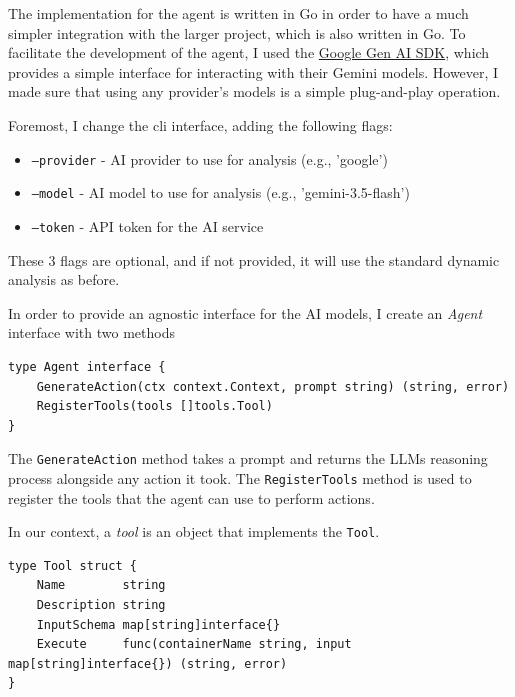 
The implementation for the agent is written in Go in order to have a much simpler integration with the
larger project, which is also written in Go. To facilitate the development of the agent, I used the
\href{https://docs.cloud.google.com/gemini-enterprise-agent-platform/models/sdks/overview#googlegenaisdk_quickstart-go_genai_sdk}{Google Gen AI SDK}, 
which provides a simple interface for interacting with their Gemini models. However, I made sure that using any provider's models is a simple plug-and-play operation.

Foremost, I change the cli interface, adding the following flags:

\begin{itemize}
\item \texttt{--provider} - AI provider to use for analysis (e.g., 'google')
\item \texttt{--model} - AI model to use for analysis (e.g., 'gemini-3.5-flash')
\item \texttt{--token} - API token for the AI service
\end{itemize}

These 3 flags are optional, and if not provided, it will use the standard dynamic analysis as before. 

In order to provide an agnostic interface for the AI models, I create an \textit{Agent} interface with two methods

\lstset{language=Go,caption=Agent interface,label=lst:agent-interface}
\begin{lstlisting}
type Agent interface {
	GenerateAction(ctx context.Context, prompt string) (string, error)
	RegisterTools(tools []tools.Tool)
}
\end{lstlisting}

The \texttt{GenerateAction} method takes a prompt and returns the LLMs reasoning process
alongside any action it took.
The \texttt{RegisterTools} method is used to register the tools that the agent can use to perform actions.

In our context, a \textit{tool} is an object that implements the \texttt{Tool}.

\lstset{language=Go,caption=Tool interface,label=lst:tool-interface}
\begin{lstlisting}
type Tool struct {
	Name        string
	Description string
	InputSchema map[string]interface{}
	Execute     func(containerName string, input map[string]interface{}) (string, error)
}
\end{lstlisting}


